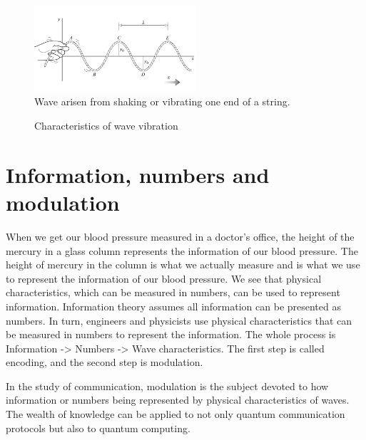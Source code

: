 \documentclass{book}
\begin{document}
\begin{figure}[ht]
\includegraphics[width=6cm]{pic/wave-in-a-string.png}
\caption{Wave arisen from shaking or vibrating one end of a string.}
\label{String}
\end{figure}

\begin{figure}[ht]
\caption{Characteristics of wave vibration}
\label{wave}
\end{figure}

\section{Information, numbers and modulation}
When we get our blood pressure measured in a doctor's office, the height of the mercury in a glass column represents 
the information of our blood pressure. The height of mercury in the column is what we actually measure and is 
what we use to represent the information of our blood pressure. We see that physical characteristics, which can be measured in numbers, can be used to represent information. Information theory assumes all information can be presented as numbers. In turn, engineers and physicists use physical characteristics that can be measured in numbers to represent the information. The whole process is
Information -> Numbers -> Wave characteristics. The first step is called encoding, and the second step is modulation.

In the study of communication, modulation is the subject devoted to how information or numbers being represented by physical characteristics of waves. The wealth of knowledge can be applied to not only quantum communication protocols but also to quantum computing.
\end{document}
